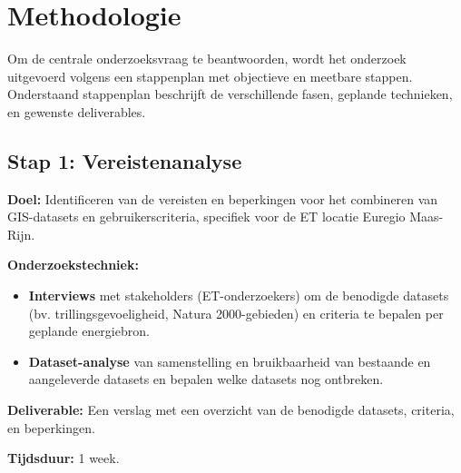 


\section{Methodologie}%
\label{sec:methodologie}

Om de centrale onderzoeksvraag te beantwoorden, wordt het onderzoek uitgevoerd volgens een stappenplan met objectieve en meetbare stappen. Onderstaand stappenplan beschrijft de verschillende fasen, geplande technieken, en gewenste deliverables.

\subsection{Stap 1: Vereistenanalyse}
\textbf{Doel:}
Identificeren van de vereisten en beperkingen voor het combineren van GIS-\-datasets en gebruikerscriteria, specifiek voor de ET locatie Euregio Maas-\-Rijn.

\textbf{Onderzoekstechniek:}
\begin{itemize}
    \item \textbf{Interviews} met stakeholders (ET-\-onderzoekers) om de benodigde datasets (bv. trillingsgevoeligheid, Natura 2000-\-gebieden) en criteria te bepalen per geplande energiebron.
    \item \textbf{Dataset-\-analyse} van samenstelling en bruikbaarheid van bestaande en aangeleverde datasets en bepalen welke datasets nog ontbreken.
\end{itemize}

\textbf{Deliverable:}
Een verslag met een overzicht van de benodigde datasets, criteria, en beperkingen.

\textbf{Tijdsduur:}
1 week.

